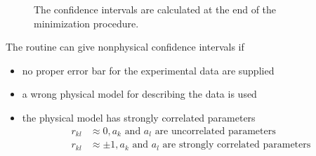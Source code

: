 \begin{figure}[htb]
\captionsetup[subfigure]{position=b}
\centering
{}
\hfill
{}
\caption{The confidence intervals are calculated at the end of the minimization procedure.}
\label{fig:FitErrors}
\end{figure}

The routine can give nonphysical confidence intervals if
\begin{itemize}
\item no proper error bar for the experimental data are supplied
\item a wrong physical model for describing the data is used
\item the physical model has strongly correlated parameters
\begin{subequations}
\begin{align}
r_{kl} &\approx 0, a_k \mbox{ and } a_l \mbox{ are uncorrelated parameters} \\
r_{kl} &\approx \pm 1, a_k \mbox{ and } a_l \mbox{ are strongly correlated parameters}
\end{align}
\end{subequations}
\end{itemize}

